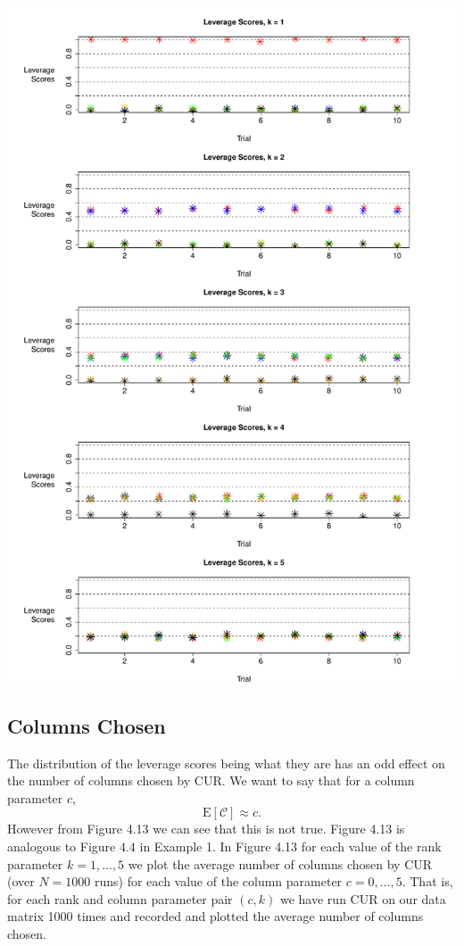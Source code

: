 \documentclass{book}
\begin{document}
\newpage
\begin{center}
\includegraphics[scale=.6]{./Figures/diag_ex_2/levs.pdf}%
\end{center}

\subsection{Columns Chosen}
The distribution of the leverage scores being what they are has an odd effect on the number of columns chosen by CUR. We want to say that for a column parameter $c$, 
$$
\text{E}\left[\mathscr{C}\right]\approx c.
$$
However from Figure 4.13 we can see that this is not true. Figure 4.13 is analogous to Figure $4.4$ in Example 1. In Figure 4.13 for each value of the rank parameter $k=1,\ldots,5$ we plot the average number of columns chosen by CUR (over $N=1000$ runs) for each value of the column parameter $c=0,\ldots,5$. That is, for each rank and column parameter pair $(c,k)$ we have run CUR on our data matrix 1000 times and recorded and plotted the average number of columns chosen.
\end{document}
